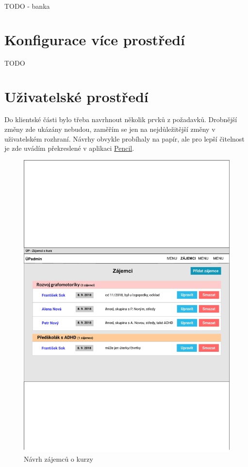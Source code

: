 TODO - banka

\section{Konfigurace více prostředí}\label{sec:konfiguraceviceprostredi}

TODO

\section{Uživatelské prostředí}

Do klientské části bylo třeba navrhnout několik prvků z požadavků. Drobnější změny zde ukázány nebudou, zaměřím se jen na nejdůležitější změny v uživatelském rozhraní. Návrhy obvykle probíhaly na papír, ale pro lepší čitelnost je zde uvádím překreslené v aplikaci \href{https://pencil.evolus.vn/}{Pencil}.

\begin{figure}[h]\centering
    \includegraphics[width=1\textwidth]{img/ui-zajemci}
    \caption{Návrh zájemců o kurzy}\label{fig:ui-zajemci}
\end{figure}

